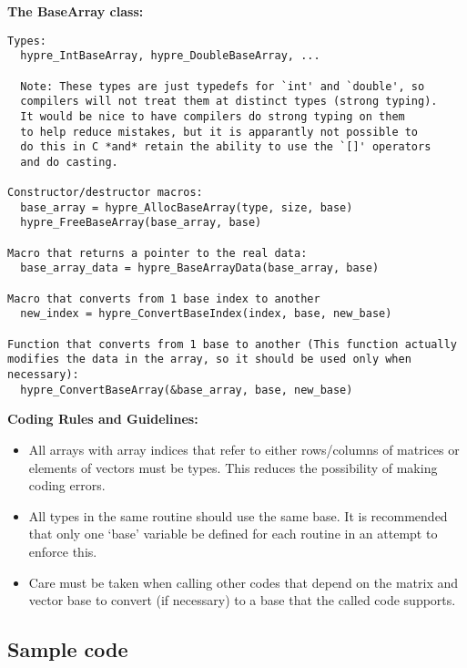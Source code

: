 {\noindent\bf The BaseArray class:}
\begin{verbatim}
Types:
  hypre_IntBaseArray, hypre_DoubleBaseArray, ...

  Note: These types are just typedefs for `int' and `double', so
  compilers will not treat them at distinct types (strong typing).
  It would be nice to have compilers do strong typing on them
  to help reduce mistakes, but it is apparantly not possible to
  do this in C *and* retain the ability to use the `[]' operators
  and do casting.

Constructor/destructor macros:
  base_array = hypre_AllocBaseArray(type, size, base)
  hypre_FreeBaseArray(base_array, base)

Macro that returns a pointer to the real data:
  base_array_data = hypre_BaseArrayData(base_array, base)

Macro that converts from 1 base index to another
  new_index = hypre_ConvertBaseIndex(index, base, new_base)

Function that converts from 1 base to another (This function actually
modifies the data in the array, so it should be used only when necessary):
  hypre_ConvertBaseArray(&base_array, base, new_base)
\end{verbatim}

{\noindent\bf Coding Rules and Guidelines:}
\begin{itemize}

\item All arrays with array indices that refer to either rows/columns
of matrices or elements of vectors must be  types.
This reduces the possibility of making coding errors.

\item All  types in the same routine should use the
same base.  It is recommended that only one `base' variable be defined
for each routine in an attempt to enforce this.

\item Care must be taken when calling other codes that depend on the
matrix and vector base to convert (if necessary) to a base that the
called code supports.

\end{itemize}

\subsection{Sample code}
\label{Sample code}

